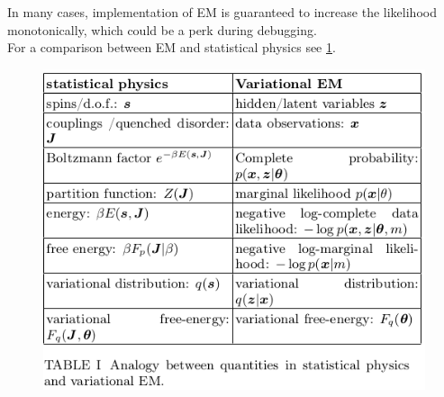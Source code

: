 In many cases, implementation of EM is guaranteed to increase the likelihood monotonically, which could be a perk during debugging.\\
For a comparison between EM and statistical physics see \ref{fig:analogyemstatphys}.

\begin{figure}[h!]
	\centering
	\includegraphics[width=0.7\linewidth]{gfx/AnalogyEMstatphys}
	\caption{}
	\label{fig:analogyemstatphys}
\end{figure}















